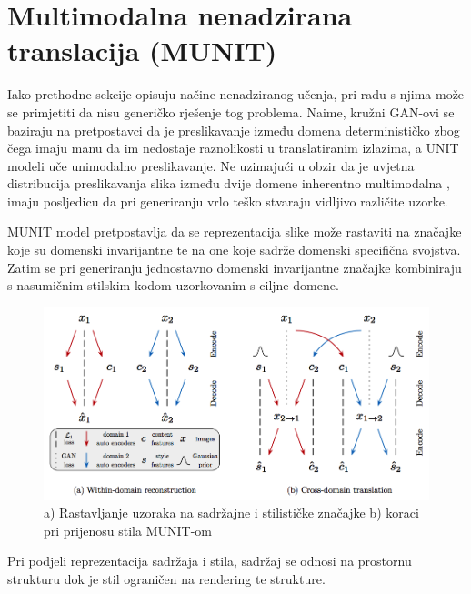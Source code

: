 \documentclass[lmodern, utf8, seminar]{fer}
\begin{document}
\section{Multimodalna nenadzirana translacija (MUNIT)}
Iako prethodne sekcije opisuju načine nenadziranog učenja, pri radu s njima može se primjetiti da nisu generičko rješenje tog problema. Naime, kružni GAN-ovi se baziraju na pretpostavci da je preslikavanje između domena determinističko zbog čega imaju manu da im nedostaje raznolikosti u translatiranim izlazima, a UNIT modeli uče unimodalno preslikavanje. Ne uzimajući u obzir da je uvjetna distribucija preslikavanja slika između dvije domene inherentno multimodalna \cite{huang2018multimodal}, imaju posljedicu  da pri generiranju vrlo teško stvaraju vidljivo različite uzorke. 
\newline

MUNIT model pretpostavlja da se reprezentacija slike može rastaviti na značajke koje su domenski invarijantne te na one koje sadrže domenski specifična svojstva. Zatim se pri generiranju jednostavno domenski invarijantne značajke kombiniraju s nasumičnim stilskim kodom uzorkovanim s ciljne domene.
\newline

\begin{figure}[H]
    \centering
    \includegraphics[width=1\textwidth]{huang2018multimodal-munit}
    \caption{a) Rastavljanje uzoraka na sadržajne i stilističke značajke b) koraci pri prijenosu stila MUNIT-om \cite{huang2018multimodal}}
    \label{fig:huang2018multimodal-munit}
\end{figure}


Pri podjeli reprezentacija sadržaja i stila, sadržaj se odnosi na prostornu strukturu dok je stil ograničen na rendering te strukture.
\end{document}
